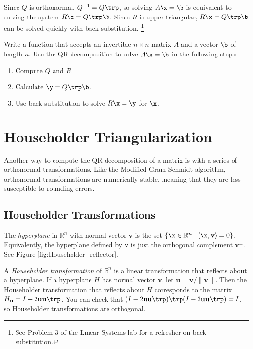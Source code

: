 Since $Q$ is orthonormal, $Q^{-1}= Q\trp$, so solving $A\x = \b$ is equivalent to solving the system $R\x = Q\trp\b$.
Since $R$ is upper-triangular, $R\x = Q\trp\b$ can be solved quickly with back substitution.%
\footnote{See Problem 3 of the Linear Systems lab for a refresher on back substitution.}

\begin{problem} %
Write a function that accepts an invertible $n \times n$ matrix $A$ and a vector $\b$ of length $n$.
Use the QR decomposition to solve $A\x = \b$ in the following steps:
\begin{enumerate}
    \item Compute $Q$ and $R$.
    \item Calculate $\y = Q\trp\b$.
    \item Use back substitution to solve $R\x = \y$ for $\x$.
\end{enumerate}
\end{problem}

\section*{Householder Triangularization} %

Another way to compute the QR decomposition of a matrix is with a series of orthonormal transformations.
Like the Modified Gram-Schmidt algorithm, orthonormal transformations are numerically stable, meaning that they are less susceptible to rounding errors.

\subsection*{Householder Transformations} %

The \emph{hyperplane} in $\mathbb{R}^n$ with normal vector $\mathbf{v}$ is the set $\{ \x \in \mathbb{R}^n \mid \langle \x, \mathbf{v} \rangle = 0 \}$.
Equivalently, the hyperplane defined by $\mathbf{v}$ is just the orthogonal complement $\mathbf{v}^{\perp}$.
See Figure \ref{fig:Householder_reflector}.

A \emph{Householder transformation} of $\mathbb{R}^n$ is a linear transformation that reflects about a hyperplane.
If a hyperplane $H$ has normal vector $\mathbf{v}$, let $\mathbf{u} = \mathbf{v}/\|\mathbf{v}\|$.
Then the Householder transformation that reflects about $H$ corresponds to the matrix $H_{\mathbf{u}} = I - 2 \mathbf{u}\mathbf{u}\trp$.
You can check that $(I - 2 \mathbf{u}\mathbf{u}\trp)\trp(I - 2 \mathbf{u}\mathbf{u}\trp)=I$, so Householder transformations are orthogonal.

